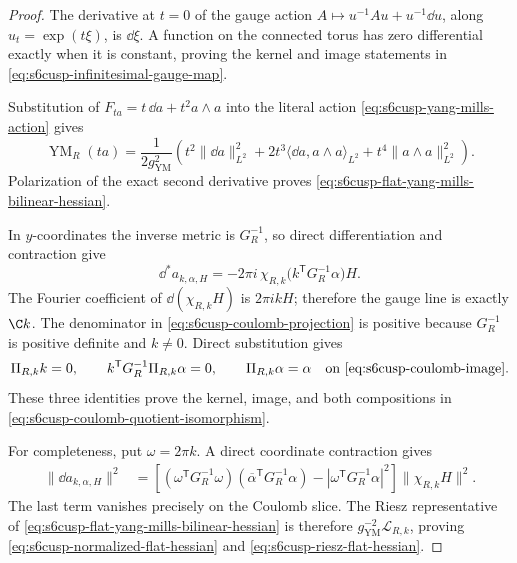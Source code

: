 \begin{proof}
The derivative at \(t=0\) of the gauge action
\(A\mapsto u^{-1}Au+u^{-1}\dd u\), along
\(u_t=\exp(t\xi)\), is \(\dd\xi\).  A function on the connected torus
has zero differential exactly when it is constant, proving the kernel and
image statements in \eqref{eq:s6cusp-infinitesimal-gauge-map}.

Substitution of \(F_{ta}=t\,\dd a+t^2a\wedge a\) into the literal action
\eqref{eq:s6cusp-yang-mills-action} gives
\[
 \operatorname{YM}_R(ta)
 =\frac1{2g_{\mathrm{YM}}^2}
 \left(
  t^2\lVert\dd a\rVert_{L^2}^2
  +2t^3\langle\dd a,a\wedge a\rangle_{L^2}
  +t^4\lVert a\wedge a\rVert_{L^2}^2
 \right).
\]
Polarization of the exact second derivative proves
\eqref{eq:s6cusp-flat-yang-mills-bilinear-hessian}.

In \(y\)-coordinates the inverse metric is \(G_R^{-1}\), so direct
differentiation and contraction give
\begin{equation}\label{eq:s6cusp-mode-divergence}
 \dd^*a_{k,\alpha,H}
 =-2\pi i\,\chi_{R,k}
 \bigl(k^{\mathsf T}G_R^{-1}\alpha\bigr)H.
\end{equation}
The Fourier coefficient of \(\dd(\chi_{R,k}H)\) is \(2\pi i kH\);
therefore the gauge line is exactly \(\C k\).
The denominator in \eqref{eq:s6cusp-coulomb-projection} is positive because
\(G_R^{-1}\) is positive definite and \(k\ne0\).  Direct substitution gives
\[
 \Pi_{R,k}k=0,\qquad
 k^{\mathsf T}G_R^{-1}\Pi_{R,k}\alpha=0,\qquad
 \Pi_{R,k}\alpha=\alpha
 \quad\text{on \eqref{eq:s6cusp-coulomb-image}.}
\]
These three identities prove the kernel, image, and both compositions in
\eqref{eq:s6cusp-coulomb-quotient-isomorphism}.

For completeness, put \(\omega=2\pi k\).  A direct coordinate contraction
gives
\begin{align*}
 \lVert\dd a_{k,\alpha,H}\rVert^2
 &=
 \left[
 (\omega^{\mathsf T}G_R^{-1}\omega)
 (\overline\alpha^{\mathsf T}G_R^{-1}\alpha)
 -
 \left|\omega^{\mathsf T}G_R^{-1}\alpha\right|^2
 \right]
 \lVert\chi_{R,k}H\rVert^2.
\end{align*}
The last term vanishes precisely on the Coulomb slice.  The Riesz
representative of \eqref{eq:s6cusp-flat-yang-mills-bilinear-hessian} is
therefore \(g_{\mathrm{YM}}^{-2}\mathcal L_{R,k}\), proving
\eqref{eq:s6cusp-normalized-flat-hessian} and
\eqref{eq:s6cusp-riesz-flat-hessian}.
\end{proof}

